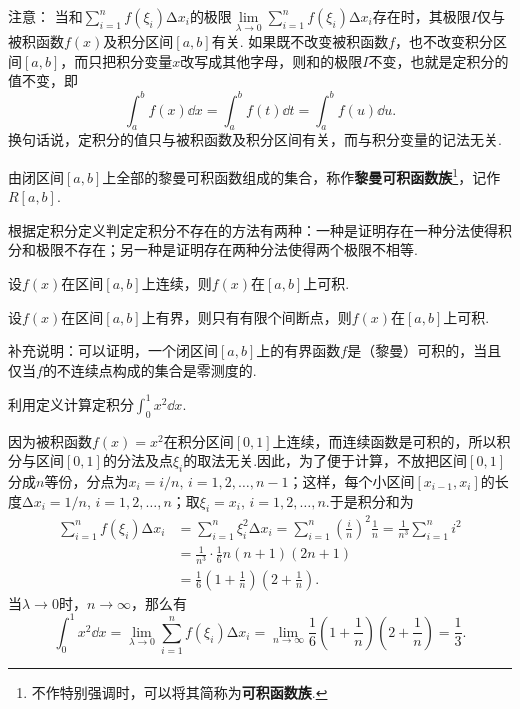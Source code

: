 注意：
当和\(\sum\limits_{i=1}^n f(\xi_i) \increment x_i\)的极限\(\lim\limits_{\lambda\to0} \sum\limits_{i=1}^n f(\xi_i) \increment x_i\)存在时，其极限\(I\)仅与被积函数\(f(x)\)及积分区间\([a,b]\)有关.
如果既不改变被积函数\(f\)，也不改变积分区间\([a,b]\)，而只把积分变量\(x\)改写成其他字母，则和的极限\(I\)不变，也就是定积分的值不变，即\[
\int_a^b f(x) \dd{x}
= \int_a^b f(t) \dd{t}
= \int_a^b f(u) \dd{u}.
\]
换句话说，定积分的值只与被积函数及积分区间有关，而与积分变量的记法无关.

\begin{definition}\label{definition:函数族.黎曼可积函数族}
由闭区间\([a,b]\)上全部的黎曼可积函数组成的集合，称作\textbf{黎曼可积函数族}\footnote{%
不作特别强调时，可以将其简称为\textbf{可积函数族}.%
}，记作\(R[a,b]\).
\end{definition}

\begin{example}[用定义法证明定积分不存在]
根据定积分定义判定定积分不存在的方法有两种：一种是证明存在一种分法使得积分和极限不存在；另一种是证明存在两种分法使得两个极限不相等.
\end{example}

\begin{theorem}[函数可积的充分条件I]
设\(f(x)\)在区间\([a,b]\)上连续，则\(f(x)\)在\([a,b]\)上可积.
\end{theorem}

\begin{theorem}[函数可积的充分条件II]
设\(f(x)\)在区间\([a,b]\)上有界，则只有有限个间断点，则\(f(x)\)在\([a,b]\)上可积.
\end{theorem}

补充说明：可以证明，一个闭区间\([a,b]\)上的有界函数\(f\)是（黎曼）可积的，当且仅当\(f\)的不连续点构成的集合是零测度的.

\begin{example}
利用定义计算定积分\(\int_0^1 x^2 \dd{x}\).
\begin{solution}
因为被积函数\(f(x) = x^2\)在积分区间\([0,1]\)上连续，而连续函数是可积的，所以积分与区间\([0,1]\)的分法及点\(\xi_i\)的取法无关.因此，为了便于计算，不放把区间\([0,1]\)分成\(n\)等份，分点为\(x_i = i/n,\,i=1,2,\dotsc,n-1\)；这样，每个小区间\([x_{i-1},x_i]\)的长度\(\increment x_i = 1/n,\,i=1,2,\dotsc,n\)；取\(\xi_i=x_i,\,i=1,2,\dotsc,n\).于是积分和为\begin{align*}
\sum\limits_{i=1}^n f(\xi_i) \increment x_i
&= \sum\limits_{i=1}^n \xi_i^2 \increment x_i
= \sum\limits_{i=1}^n \left(\frac{i}{n}\right)^2 \frac{1}{n}
= \frac{1}{n^3} \sum\limits_{i=1}^n i^2 \\
&= \frac{1}{n^3} \cdot \frac{1}{6} n(n+1)(2n+1) \\
&= \frac{1}{6} \left(1+\frac{1}{n}\right) \left(2+\frac{1}{n}\right).
\end{align*}
当\(\lambda\to0\)时，\(n\to\infty\)，那么有\[
\int_0^1 x^2 \dd{x}
= \lim\limits_{\lambda\to0} \sum\limits_{i=1}^n f(\xi_i) \increment x_i
= \lim\limits_{n\to\infty} \frac{1}{6} \left(1+\frac{1}{n}\right) \left(2+\frac{1}{n}\right)
= \frac{1}{3}.
\]
\end{solution}
\end{example}

